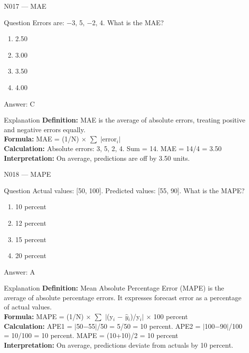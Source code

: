 \documentclass[aspectratio=169,8pt]{beamer}
\begin{document}
	\begin{frame}{N017 --- MAE}
		\begin{block}{Question}
			Errors are: $-$3, 5, $-$2, 4. What is the MAE?
			\begin{enumerate}
				\item 2.50
				\item 3.00
				\item 3.50
				\item 4.00
			\end{enumerate}
		\end{block}
		\begin{exampleblock}{Answer: C}\end{exampleblock}
		\begin{block}{Explanation}
			\textbf{Definition:} MAE is the average of absolute errors, treating positive and negative errors equally.\\
			\textbf{Formula:} MAE = (1/N) $\times$ $\sum$ $|$error$_{i}$$|$\\
			\textbf{Calculation:} Absolute errors: 3, 5, 2, 4. Sum = 14. MAE = 14/4 = 3.50\\
			\textbf{Interpretation:} On average, predictions are off by 3.50 units.
		\end{block}
	\end{frame}
	
	\begin{frame}{N018 --- MAPE}
		\begin{block}{Question}
			Actual values: [50, 100]. Predicted values: [55, 90]. What is the MAPE?
			\begin{enumerate}
				\item 10 percent
				\item 12 percent
				\item 15 percent
				\item 20 percent
			\end{enumerate}
		\end{block}
		\begin{exampleblock}{Answer: A}\end{exampleblock}
		\begin{block}{Explanation}
			\textbf{Definition:} Mean Absolute Percentage Error (MAPE) is the average of absolute percentage errors. It expresses forecast error as a percentage of actual values.\\
			\textbf{Formula:} MAPE = (1/N) $\times$ $\sum$ $|$(y$_{i}$ $-$ $\hat{y}$$_{i}$)/y$_{i}$$|$ $\times$ 100 percent\\
			\textbf{Calculation:} APE1 = $|$50$-$55$|$/50 = 5/50 = 10 percent. APE2 = $|$100$-$90$|$/100 = 10/100 = 10 percent. MAPE = (10+10)/2 = 10 percent\\
			\textbf{Interpretation:} On average, predictions deviate from actuals by 10 percent.
		\end{block}
	\end{frame}
	
\end{document}
